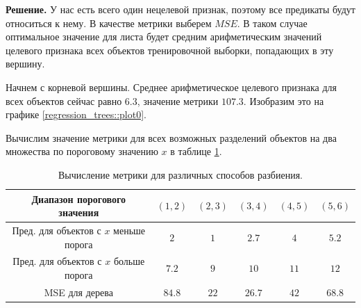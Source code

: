     \textbf{Решение.}
    У нас есть всего один нецелевой признак, поэтому все предикаты будут относиться к нему. В качестве метрики выберем $MSE$. В таком случае оптимальное значение для листа будет средним арифметическим значений целевого признака всех объектов тренировочной выборки, попадающих в эту вершину.

    Начнем с корневой вершины. Среднее арифметическое целевого признака для всех объектов сейчас равно $6.3$, значение метрики $107.3$. Изобразим это на графике \ref{regression_trees::plot0}. 
    
    \begin{center}
    \end{center}
    
    Вычислим значение метрики для всех возможных разделений объектов на два множества по пороговому значению $x$ в таблице \ref{regression_trees::table1}.
    \begin{table}[h] 
    \centering
    \caption{Вычисление метрики для различных способов разбиения.}
    \begin{tabular}{|c|c|c|c|c|c|}
    \hline
    Диапазон порогового значения & $(1, 2)$ & $(2, 3)$ & $(3, 4)$ & $(4, 5)$ & $(5, 6)$ \\
    \hline
    Пред. для объектов с $x$ меньше порога & $2$ & $1$ & $2.7$ & $4$ & $5.2$ \\
    \hline
    Пред. для объектов с $x$ больше порога & $7.2$ & $9$ & $10$ & $11$ & $12$ \\
    \hline
    MSE для дерева & $84.8$ & $22$ & $26.7$ & $42$ & $68.8$ \\
    \hline
    \end{tabular} \label{regression_trees::table1}
    \end{table}
    
